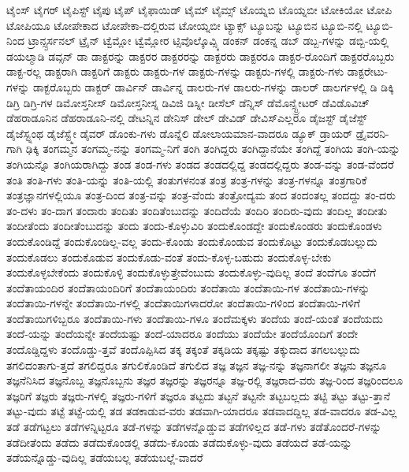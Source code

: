 {ಟೈಂಸ್
ಟೈಗರ್
ಟೈಪಿಸ್ಟ್
ಟೈಪು
ಟೈಪ್
ಟೈಫಾಯಿಡ್
ಟೈಮ್
ಟೈಮ್ಸ್
ಟೊಯ್ನಬಿ
ಟೊಯ್ನಬೀ
ಟೋಕಿಯೋ
ಟೋಪಿ
ಟೋಪಿಯೂ
ಟೋಪೇಕಾದ
ಟೋಪೇಕಾ-ದಲ್ಲಿರುವ
ಟೋಯ್ನಬೀ
ಟ್ಯಾಕ್ಸ್
ಟ್ಯೂಬನ್ನು
ಟ್ಯೂಬಿನ
ಟ್ಯೂಬಿ-ನಲ್ಲಿ
ಟ್ಯೂಬಿ-ನಿಂದ
ಟ್ರಾನ್ಸ್ಪರ್ಸನಲ್
ಟ್ರೈನ್
ಟ್ವೆಮ್ಲೋ
ಟ್ವೆಮ್ಲೋರ
ಟ್ಸಿವೊಲ್ಕೊವ್ಸ್ಕಿ
ಡಂಕನ್
ಡಂಕನ್ನ
ಡಬ್
ಡಬ್ಬ-ಗಳನ್ನು
ಡಬ್ಬಿ-ಯಲ್ಲಿ
ಡಯಲ್ಮಾಡಿ
ಡವ್ಸನ್
ಡಾ
ಡಾಕ್ಟರನ್ನು
ಡಾಕ್ಟರರ
ಡಾಕ್ಟರರನ್ನು
ಡಾಕ್ಟರರು
ಡಾಕ್ಟರರೂ
ಡಾಕ್ಟರ-ರೊಂದಿಗೆ
ಡಾಕ್ಟರರೊಬ್ಬರು
ಡಾಕ್ಟ-ರಲ್ಲ
ಡಾಕ್ಟರಾಗಿ
ಡಾಕ್ಟರಿಗೆ
ಡಾಕ್ಟರು
ಡಾಕ್ಟರು-ಗಳ
ಡಾಕ್ಟರು-ಗಳನ್ನು
ಡಾಕ್ಟರು-ಗಳಲ್ಲಿ
ಡಾಕ್ಟರು-ಗಳು
ಡಾಕ್ಟರೇಟು-ಗಳನ್ನು
ಡಾಕ್ಟರೊಬ್ಬರು
ಡಾಕ್ಟರ್
ಡಾರ್ವಿನ್
ಡಾರ್ವಿನ್ನ
ಡಾಲರು-ಗಳ
ಡಾಲರು-ಗಳನ್ನು
ಡಾಲರ್
ಡಾಲರ್ಗಳಲ್ಲಿ
ಡಿ
ಡಿಕ್ಕಿ
ಡಿಗ್ರಿ
ಡಿಗ್ರಿ-ಗಳ
ಡಿಮೋಸ್ತನೀಸ್
ಡಿಮೋಸ್ತನೀಸ್ನ
ಡಿವಿಜಿ
ಡಿಸ್ನೀ
ಡೀಸೆಲ್
ಡೆನ್ನಿಸ್
ಡೆಮೊನ್ಸ್ಟ್ರೇಟರ್
ಡೆವಿಡೊವಿಚ್
ಡೆಹರಾಡೂನಿನ
ಡೆಹರಾಡೂನಿ-ನಲ್ಲಿ
ಡೇಟನ್ನಿನ
ಡೇನಿಸ್
ಡೇಲ್
ಡೇವಿಡ್
ಡೇವಿಸ್ಎಲ್ಲರೂ
ಡೈಜಸ್ಟ್
ಡೈಜೆಸ್ಟ್
ಡೈಜೆಸ್ಟ್ನಂಥ
ಡೈಜೆಸ್ಟ್ಮೇ
ಡೈವರ್
ಡೊಂಕು-ಗಳು
ಡೊನ್ನೆಲಿ
ಡೋಲಾಯಮಾನ-ವಾದರೂ
ಡ್ಯೂಕ್
ಡ್ರಾಯರ್
ಡ್ರೈವರನಿ-ಗಾಗಿ
ಢಿಕ್ಕಿ
ತಂಗಮ್ಮನ
ತಂಗಮ್ಮ-ನನ್ನು
ತಂಗಮ್ಮ-ನಿಗೆ
ತಂಗಿ
ತಂಗಿದ್ದರು
ತಂಗಿದ್ದಾನೆಯೇ
ತಂಗಿದ್ದೆ
ತಂಗಿಯ
ತಂಗಿ-ಯನ್ನು
ತಂಗಿಯನ್ನೊ
ತಂಗಿಯರಾಗಿದ್ದು
ತಂಡ
ತಂಡ-ಗಳು
ತಂಡದ
ತಂಡದಲ್ಲಿದ್ದ
ತಂಡದಲ್ಲಿದ್ದರು
ತಂಡ-ವನ್ನು
ತಂಡ-ವೆಂದರೆ
ತಂತಿ
ತಂತಿ-ಗಳು
ತಂತಿ-ಯನ್ನು
ತಂತಿ-ಯಲ್ಲಿ
ತಂತುಗಳನಂತ
ತಂತ್ರ
ತಂತ್ರ-ಗಳನ್ನು
ತಂತ್ರ-ಗಳನ್ನೂ
ತಂತ್ರಗಾರಿಕೆ
ತಂತ್ರಜ್ಞಾನಗಳಲ್ಲಿಯೂ
ತಂತ್ರ-ದಿಂದ
ತಂತ್ರ-ವನ್ನು
ತಂತ್ರ-ವೆಂದು
ತಂತ್ರೋದ್ಯಮ
ತಂದ
ತಂದಂತಲ್ಲ
ತಂದದ್ದು
ತಂ-ದರು
ತಂ-ದಳು
ತಂ-ದಾಗ
ತಂದಾರು
ತಂದಿತು
ತಂದಿತೆಂಬುದನ್ನು
ತಂದಿದೆಯೆ
ತಂದಿರಿ
ತಂದಿರು-ವುದು
ತಂದಿಲ್ಲ
ತಂದೀತು
ತಂದೀತೆಂದು
ತಂದೀತೆಂಬುದನ್ನು
ತಂದು
ತಂದು-ಕೊಳ್ಳುವಿರಿ
ತಂದುಕೊಂಡದ್ದೇ
ತಂದುಕೊಂಡರು
ತಂದುಕೊಂಡಳು
ತಂದುಕೊಂಡಿದ್ದೆ
ತಂದುಕೊಂಡಿಲ್ಲ-ವಲ್ಲ
ತಂದು-ಕೊಂಡು
ತಂದುಕೊಂಡುವ
ತಂದುಕೊಟ್ಟು
ತಂದುಕೊಡಬಲ್ಲುದು
ತಂದುಕೊಡಲು
ತಂದುಕೊಡುವ
ತಂದುಕೊಡು-ವಂತೆ
ತಂದು-ಕೊಳ್ಳ-ಬಹುದು
ತಂದುಕೊಳ್ಳ-ಬೇಕು
ತಂದುಕೊಳ್ಳಬೇಕೆಂದು
ತಂದುಕೊಳ್ಳಿ
ತಂದುಕೊಳ್ಳುತ್ತೇವೆಂಬುದು
ತಂದುಕೊಳ್ಳು-ವುದಿಲ್ಲ
ತಂದೆ
ತಂದೆಗೂ
ತಂದೆಗೆ
ತಂದೆತಾಯಂದಿರ
ತಂದೆತಾಯಂದಿರಿಗೆ
ತಂದೆತಾಯಂದಿರು
ತಂದೆತಾಯಿ
ತಂದೆತಾಯಿ-ಗಳ
ತಂದೆತಾಯಿ-ಗಳನ್ನು
ತಂದೆತಾಯಿ-ಗಳನ್ನೇ
ತಂದೆತಾಯಿ-ಗಳಲ್ಲಿ
ತಂದೆತಾಯಿಗಳಾದರೋ
ತಂದೆತಾಯಿ-ಗಳಿಂದ
ತಂದೆತಾಯಿ-ಗಳಿಗೆ
ತಂದೆತಾಯಿಗಳಿಬ್ಬರೂ
ತಂದೆತಾಯಿ-ಗಳು
ತಂದೆತಾಯಿ-ಗಳೂ
ತಂದೆಮಕ್ಕಳು
ತಂದೆಯ
ತಂದೆ-ಯಂತೆ
ತಂದೆಯದು
ತಂದೆ-ಯನ್ನು
ತಂದೆಯನ್ನೇ
ತಂದೆಯಷ್ಟು
ತಂದೆ-ಯಾದರೂ
ತಂದೆಯು
ತಂದೆಯೇ
ತಂದೆಯೊಂದಿಗೆ
ತಂದೇ
ತಂದೊಡ್ಡಿದ್ದಳು
ತಂದೊಡ್ಡು-ತ್ತವೆ
ತಂದೊಪ್ಪಿಸಿದ
ತಕ್ಕ
ತಕ್ಕಂತೆ
ತಕ್ಕಡಿಯ
ತಕ್ಕಷ್ಟು
ತಕ್ಕುದಾದ
ತಗಲಬಲ್ಲುದು
ತಗಲಿದಂತಾಗು-ತ್ತದೆ
ತಗಲಿದ್ದರೂ
ತಗುಲಿಕೊಂಡಿದೆ
ತಗುಲಿದ
ತಜ್ಞ
ತಜ್ಞನ
ತಜ್ಞ-ನನ್ನು
ತಜ್ಞನಾಗಲೀ
ತಜ್ಞನು
ತಜ್ಞನೂ
ತಜ್ಞನೆನಿಸಿದ
ತಜ್ಞನೊಬ್ಬ
ತಜ್ಞನೊಬ್ಬನು
ತಜ್ಞರ
ತಜ್ಞರನ್ನು
ತಜ್ಞರನ್ನೂ
ತಜ್ಞ-ರಲ್ಲಿ
ತಜ್ಞರಾದ-ವರು
ತಜ್ಞ-ರಿಂದ
ತಜ್ಞರಿಂದಲೂ
ತಜ್ಞರಿಗೆ
ತಜ್ಞರು
ತಜ್ಞರು-ಗಳಲ್ಲಿ
ತಜ್ಞರು-ಗಳಿಗೆ
ತಜ್ಞರೂ
ತಟ್ಟದು
ತಟ್ಟನೆ
ತಟ್ಟನೇ
ತಟ್ಟಬಲ್ಲದು
ತಟ್ಟಿ
ತಟ್ಟು
ತಟ್ಟು-ತ್ತಾನೆ
ತಟ್ಟು-ವುದು
ತಟ್ಟೆ
ತಟ್ಟೆ-ಯಲ್ಲಿ
ತಡ
ತಡಕಾಡುವ-ವರು
ತಡವಾಗಿ-ಯಾದರೂ
ತಡವಾದದ್ದಿಲ್ಲ
ತಡ-ವಾದರೂ
ತಡ-ವಿಲ್ಲ
ತಡೆ
ತಡೆಗಟ್ಟಲು
ತಡೆಗಳನ್ನಿಟ್ಟರೂ
ತಡೆ-ಗಳನ್ನು
ತಡೆಗಳನ್ನೊಡ್ಡುವ
ತಡೆಗಳಿಲ್ಲದ
ತಡೆ-ಗಳು
ತಡೆತೊಂದರೆ-ಗಳನ್ನು
ತಡೆದೀತೆಂದು
ತಡೆದು
ತಡೆದುಕೊಂಡಲ್ಲಿ
ತಡೆದು-ಕೊಂಡು
ತಡೆದುಕೊಳ್ಳು-ವುದು
ತಡೆಯದೆ
ತಡೆ-ಯನ್ನು
ತಡೆಯನ್ನೊಡ್ಡು-ವುದಿಲ್ಲ
ತಡೆಯಬಲ್ಲ
ತಡೆಯಬಲ್ಲೆ-ವಾದರೆ
}
